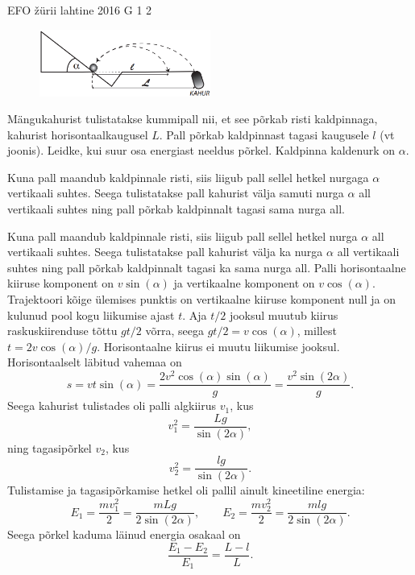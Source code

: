 {EFO žürii} %
{lahtine} %
{2016} %
{G 1} %
{2} %
{
\ifStatement
\begin{figure}
 \vspace{-20pt}
 \begin{center}
 \includegraphics[width=0.5\textwidth]{2016-lahg-01-kaldjoonis}
 \end{center}
 \vspace{-30pt}
\end{figure}

Mängukahurist tulistatakse kummipall nii, et see põrkab risti kaldpinnaga, kahurist horisontaalkaugusel $L$. Pall põrkab kaldpinnast tagasi kaugusele $l$ (vt joonis). Leidke, kui suur osa energiast neeldus põrkel. Kaldpinna kaldenurk on $\alpha$.
\fi


\ifHint
Kuna pall maandub kaldpinnale risti, siis liigub pall sellel hetkel nurgaga $\alpha$ vertikaali suhtes. Seega tulistatakse pall kahurist välja samuti nurga $\alpha$ all vertikaali suhtes ning pall põrkab kaldpinnalt tagasi sama nurga all.
\fi


\ifSolution
Kuna pall maandub kaldpinnale risti, siis liigub pall sellel hetkel nurga $\alpha$ all vertikaali suhtes. Seega tulistatakse pall kahurist välja ka nurga $\alpha$ all vertikaali suhtes ning pall põrkab kaldpinnalt tagasi ka sama nurga all. Palli horisontaalne kiiruse komponent on $v\sin(\alpha)$ ja vertikaalne komponent on $v\cos(\alpha)$. Trajektoori kõige ülemises punktis on vertikaalne kiiruse komponent null ja on kulunud pool kogu liikumise ajast $t$. Aja $t/2$ jooksul muutub kiirus raskuskiirenduse tõttu $gt/2$ võrra, seega $gt/2 =v\cos(\alpha)$, millest $t=2v\cos(\alpha)/g$. Horisontaalne kiirus ei muutu liikumise jooksul. Horisontaalselt läbitud vahemaa on $$s=vt\sin(\alpha)=\frac{2v^2\cos(\alpha)\sin(\alpha)}{g} = \frac{v^2\sin(2\alpha)}{g}.$$
Seega kahurist tulistades oli palli algkiirus $v_1$, kus
\[ v_1^2 = \frac{Lg}{\sin(2\alpha)}, \]
ning tagasipõrkel $v_2$, kus
\[ v_2^2 = \frac{lg}{\sin(2\alpha)}. \]
Tulistamise ja tagasipõrkamise hetkel oli pallil ainult kineetiline energia:
\[ E_1 = \frac{mv_1^2}{2}=\frac{mLg}{2\sin(2\alpha)},\quad\quad E_2 =\frac{mv_2^2}{2} = \frac{mlg}{2\sin(2\alpha)}. \]
Seega põrkel kaduma läinud energia osakaal on
\[ \frac{E_1-E_2}{E_1} = \frac{L-l}{L}. \]
\fi


}
